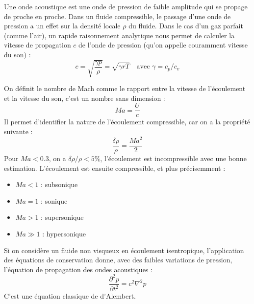 
Une onde acoustique est une onde de pression de faible amplitude qui se propage de proche en proche. Dans un fluide compressible, le passage d'une onde de pression a un effet sur la densité locale $\rho$ du fluide. Dans le cas d'un gaz parfait (comme l'air), un rapide raisonnement analytique nous permet de calculer la vitesse de propagation $c$ de l'onde de pression (qu'on appelle couramment vitesse du son) :
%
\begin{equation}
    c = \sqrt{\frac{\gamma p}{\rho}} = \sqrt{\gamma r T}
    \quad \text{avec } \gamma = c_p / c_v
\end{equation}

On définit le nombre de Mach comme le rapport entre la vitesse de l'écoulement et la vitesse du son, c'est un nombre sans dimension :
%
\begin{equation}
    Ma = \frac{U}{c}
\end{equation}
%
Il permet d'identifier la nature de l'écoulement compressible, car on a la propriété suivante :
%
\begin{equation}
    \frac{\delta \rho}{\rho} = \frac{{Ma}^2}{2}
\end{equation}
%
Pour $Ma < 0.3$, on a $\delta \rho / \rho < 5\%$, l'écoulement est incompressible avec une bonne estimation. L'écoulement est ensuite compressible, et plus précisemment :
%
\begin{itemize}
    \item $Ma < 1$ : subsonique
    \item $Ma = 1$ : sonique
    \item $Ma > 1$ : supersonique
    \item $Ma \gg 1$ : hypersonique
\end{itemize}

Si on considère un fluide non visqueux en écoulement isentropique, l'application des équations de conservation donne, avec des faibles variations de pression, l'équation de propagation des ondes acoustiques :
%
\begin{equation}
    \frac{\partial^2 p}{\partial t^2} = c^2 \nabla^2 p
\end{equation}
%
C'est une équation classique de d'Alembert.

